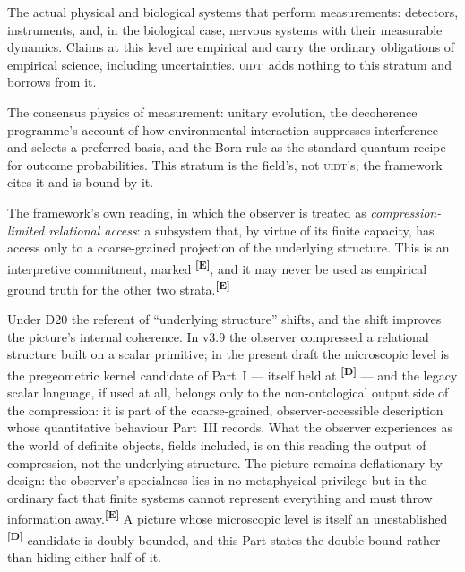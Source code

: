\documentclass[12pt,a4paper,twoside]{article}
\theoremstyle{plain}
\theoremstyle{definition}
\theoremstyle{remark}
\newcommand{\UIDT}{\textsc{uidt}}
\newcommand{\catmark}[1]{\textsuperscript{\textsf{\textbf{[#1]}}}}
\begin{document}
\begin{description}[leftmargin=1.4em,style=nextline]
\item[Stratum~I: Empirical observer systems.] The actual physical and
biological systems that perform measurements: detectors, instruments,
and, in the biological case, nervous systems with their measurable
dynamics. Claims at this level are empirical and carry the ordinary
obligations of empirical science, including uncertainties. \UIDT\ adds
nothing to this stratum and borrows from it.
\item[Stratum~II: Standard quantum and decoherence formalism.] The
consensus physics of measurement: unitary evolution, the decoherence
programme's account of how environmental interaction suppresses
interference and selects a preferred basis, and the Born rule as the
standard quantum recipe for outcome probabilities. This stratum is the
field's, not \UIDT's; the framework cites it and is bound by it.
\item[Stratum~III: The \UIDT\ interpretation.] The framework's own
reading, in which the observer is treated as \emph{compression-limited
relational access}: a subsystem that, by virtue of its finite capacity,
has access only to a coarse-grained projection of the underlying
structure. This is an interpretive commitment, marked \catmark{E}, and
it may never be used as empirical ground truth for the other two
strata.\catmark{E}
\end{description}

\noindent Under D20 the referent of ``underlying structure'' shifts, and
the shift improves the picture's internal coherence. In v3.9 the
observer compressed a relational structure built on a scalar primitive; in
the present draft the microscopic level is the pregeometric
kernel candidate of Part~I --- itself held at \catmark{D} --- and the
legacy scalar language, if used at all, belongs only to the non-ontological output side of
the compression: it is part of the coarse-grained, observer-accessible
description whose quantitative behaviour Part~III records. What the
observer experiences as the world of definite objects, fields included,
is on this reading the output of compression, not the underlying
structure. The picture remains deflationary by design: the observer's
specialness lies in no metaphysical privilege but in the ordinary fact
that finite systems cannot represent everything and must throw
information away.\catmark{E} A picture whose microscopic level is itself
an unestablished \catmark{D} candidate is doubly bounded, and this Part
states the double bound rather than hiding either half of it.
\end{document}
